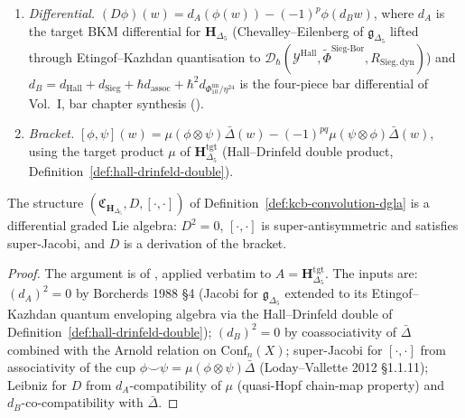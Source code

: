 \begin{definition}
\begin{enumerate}[label=\textup{(\alph*)}]
\item \emph{Differential.}
 $(D\phi)(w) = d_A(\phi(w)) - (-1)^p \phi(d_B w)$,
 where $d_A$ is the target BKM differential for $\mathbf{H}_{\Delta_5}$
 (Chevalley--Eilenberg of $\mathfrak{g}_{\Delta_5}$ lifted through
 Etingof--Kazhdan quantisation to
 $\mathcal{D}_\hbar(\mathcal{Y}^{\mathrm{Hall}},
 \widetilde{\Phi}^{\mathrm{Sieg\text{-}Bor}}, R_{\mathrm{Sieg,dyn}})$)
 and $d_B = d_{\mathrm{Hall}} + d_{\mathrm{Sieg}} +
 \hbar d_{\mathrm{assoc}} + \hbar^2 d_{\Phi_{10}^{\mathrm{un}}/\eta^{24}}$ is the
 four-piece bar differential of Vol.~I, bar chapter synthesis
 (\cite{VolI}).
\item \emph{Bracket.}
 $[\phi,\psi](w) = \mu(\phi\otimes\psi)\bar\Delta(w) - (-1)^{pq}
 \mu(\psi\otimes\phi)\bar\Delta(w)$,
 using the target product $\mu$ of
 $\mathbf{H}_{\Delta_5}^{\mathrm{tgt}}$ (Hall--Drinfeld double product,
 Definition~\ref{def:hall-drinfeld-double}).
\end{enumerate}
\end{definition}

\begin{theorem}
\label{thm:kcb-convolution-dgla-axioms}
The structure $(\mathfrak{C}_{\mathbf{H}_{\Delta_5}}, D,
[\cdot,\cdot])$ of Definition~\ref{def:kcb-convolution-dgla} is a
differential graded Lie algebra: $D^2 = 0$, $[\cdot,\cdot]$ is
super-antisymmetric and satisfies super-Jacobi, and $D$ is a
derivation of the bracket.
\end{theorem}

\begin{proof}
The argument is \cite{VolI} of
\cite{VolI}, applied verbatim to
$A = \mathbf{H}_{\Delta_5}^{\mathrm{tgt}}$. The inputs are:
$(d_A)^2 = 0$ by Borcherds 1988 \S 4 (Jacobi for
$\mathfrak{g}_{\Delta_5}$ extended to its Etingof--Kazhdan quantum
enveloping algebra via the Hall--Drinfeld double of
Definition~\ref{def:hall-drinfeld-double}); $(d_B)^2 = 0$ by
coassociativity of $\bar\Delta$ combined with the Arnold relation
on $\mathrm{Conf}_n(X)$; super-Jacobi for $[\cdot,\cdot]$ from
associativity of the cup $\phi\smile\psi = \mu(\phi\otimes\psi)\bar\Delta$
(Loday--Vallette 2012 \S 1.1.11); Leibniz for $D$ from
$d_A$-compatibility of $\mu$ (quasi-Hopf chain-map property) and
$d_B$-co-compatibility with $\bar\Delta$.
\end{proof}

